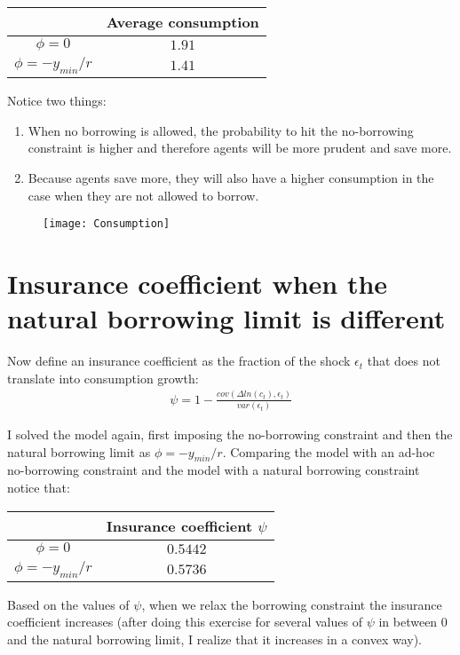 \documentclass[letter,11pt]{article}
\begin{document}
\begin{tabular}{ c| c  }
& Average consumption \\ \hline
$\phi = 0$ & $1.91$ \\ 
$\phi = -y_{min}/r$ & $1.41$ \\  \hline
\end{tabular}

Notice two things:
\begin{enumerate}[noitemsep]
\item When no borrowing is allowed, the probability to hit the no-borrowing constraint is higher and therefore agents will be more prudent and save more. 
\item Because agents save more, they will also have a higher consumption in the case when they are not allowed to borrow. 
\end{enumerate}

\begin{figure}[h!]
  \centering
        \texttt{[image: Consumption]}
  \end{figure}


\section{Insurance coefficient when the natural borrowing limit is different}
\hfill

Now define an insurance coefficient as the fraction of the shock $\epsilon_t$ that does not translate into consumption growth:
\begin{align*}
\psi = 1- \frac{cov(\Delta ln (c_t),\epsilon_t)}{var(\epsilon_t)}
\end{align*}

I solved the model again, first imposing the no-borrowing constraint and then the natural borrowing limit as  $\phi = -y_{min}/r$. Comparing the model with an ad-hoc no-borrowing constraint and the model with a natural borrowing constraint  notice that:

\begin{tabular}{ c| c  }
   & Insurance coefficient $\psi$ \\ \hline
$\phi = 0$ & $0.5442$ \\ 
$\phi = -y_{min}/r$ & $0.5736$ \\  \hline
\end{tabular}

Based on the values of $\psi$, when we relax the borrowing constraint the insurance coefficient increases (after doing this exercise for several values of $\psi$ in between 0 and the natural borrowing limit, I realize that it increases in a convex way).
\end{document}
